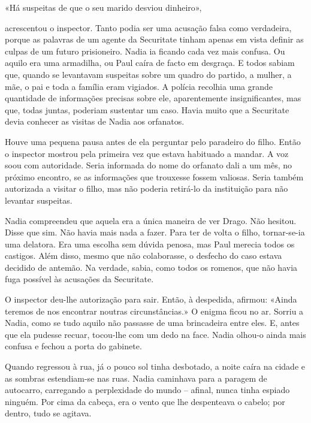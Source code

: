 «Há suspeitas de que o seu marido desviou dinheiro»,

acrescentou o inspector. Tanto podia ser uma acusação falsa como
verdadeira, porque as palavras de um agente da Securitate tinham apenas
em vista definir as culpas de um futuro prisioneiro. Nadia ia ficando
cada vez mais confusa. Ou aquilo era uma armadilha, ou Paul caíra de
facto em desgraça. E todos sabiam que, quando se levantavam suspeitas
sobre um quadro do partido, a mulher, a
mãe, o pai e toda a família eram vigiados. A polícia recolhia uma
grande quantidade de informações precisas sobre ele, aparentemente
insignificantes, mas que, todas juntas, poderiam sustentar um caso.
Havia muito que a Securitate devia conhecer as visitas de Nadia aos
orfanatos.

Houve uma pequena pausa antes de ela perguntar pelo paradeiro do filho.
Então o inspector mostrou pela primeira vez que estava habituado a
mandar. A voz soou com autoridade. Seria informada do nome do orfanato
dali a um mês, no próximo encontro, se as informações que trouxesse
fossem valiosas. Seria também autorizada a visitar o filho, mas não
poderia retirá-lo da instituição para não levantar suspeitas.

Nadia compreendeu que aquela era a única maneira de ver Drago. Não
hesitou. Disse que sim. Não havia mais nada a fazer. Para ter de volta o
filho, tornar-se-ia uma delatora. Era uma escolha sem dúvida penosa, mas
Paul merecia todos os castigos. Além disso, mesmo que não colaborasse, o
desfecho do caso estava decidido de antemão. Na verdade, sabia, como
todos os romenos, que não havia fuga possível às acusações da
Securitate.

O inspector deu-lhe autorização para sair. Então, à despedida,
afirmou: «Ainda teremos de nos encontrar noutras circunstâncias.» O
enigma ficou no ar. Sorriu a Nadia, como se tudo aquilo não passasse de
uma brincadeira entre eles. E, antes que ela pudesse recuar, tocou-lhe
com um dedo na face. Nadia olhou-o ainda mais confusa e fechou a porta
do gabinete.

Quando regressou à rua, já o pouco sol tinha desbotado, a noite caíra
na cidade e as sombras estendiam-se nas
ruas. Nadia caminhava para a paragem de autocarro, carregando a
perplexidade do mundo -- afinal, nunca tinha espiado ninguém. Por cima
da cabeça, era o vento que lhe despenteava o cabelo; por dentro, tudo se
agitava.

